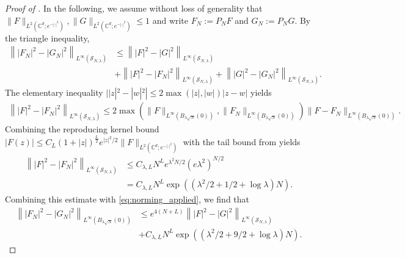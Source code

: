 \documentclass[11pt]{amsart}
\begin{document}
\begin{proof}[Proof of ]
    In the following, we assume without loss of generality that $\|F\|_{L^2(\mathbb C^d;e^{-|\cdot|^2})}, \|G\|_{L^2(\mathbb C^d;e^{-|\cdot|^2})} \leq 1$ and write $F_N := P_N F$ and $G_N := P_N G$. By the triangle inequality,
    \begin{align*}
        \left\lVert |F_N|^2-|G_N|^2 \right\rVert_{L^\infty(\mathcal S_{N,\lambda})} &\leq \left\lVert |F|^2-|G|^2 \right\rVert_{L^\infty(\mathcal S_{N,\lambda})} \\ &+ \left\lVert |F|^2-|F_N|^2 \right\rVert_{L^\infty(\mathcal S_{N,\lambda})} + \left\lVert |G|^2-|G_N|^2 \right\rVert_{L^\infty(\mathcal S_{N,\lambda})}.
    \end{align*}
    The elementary inequality $||z|^2-|w|^2| \leq 2 \max(|z|,|w|) |z-w|$ yields
    \begin{align*}
        \left\lVert |F|^2-|F_N|^2 \right\rVert_{L^\infty(\mathcal S_{N,\lambda})} \leq 2 \max(\|F\|_{L^\infty(B_{\lambda \sqrt{N}}(0))},\|F_N\|_{L^\infty(B_{\lambda \sqrt{N}}(0))}) \| F - F_N \|_{L^\infty(B_{\lambda \sqrt{N}}(0))}.
    \end{align*}
    Combining the reproducing kernel bound $|F(z)| \leq C_{L}(1+|z|)^{\frac L2} e^{|z|^2/2} \|F\|_{L^2(\mathbb C^d;e^{-|\cdot|^2})}$ with the tail bound from  yields
    \begin{align*}
        \left\lVert |F|^2-|F_N|^2 \right\rVert_{L^\infty(\mathcal S_{N,\lambda})} &\leq C_{\lambda,L} N^{L} e^{\lambda^2N/2} (e \lambda^2)^{N/2} \\
        &= C_{\lambda,L} N^{L} \exp((\lambda^2/2 + 1/2 + \log \lambda) N).
    \end{align*}
    Combining this estimate with \eqref{eq:norming_applied}, we find that 
    \begin{align*}
        \left\lVert |F_N|^2-|G_N|^2 \right 
        \rVert_{L^\infty(B_{\lambda \sqrt{N}}(0))}
        &\leq e^{4(N+L)} \left\lVert |F|^2-|G|^2 \right
        \rVert_{L^\infty(\mathcal S_{N,\lambda})} \\
        &+ C_{\lambda,L} N^{L} \exp\left(\left(\lambda^2/2 + 9/2 + \log \lambda\right) N\right).
    \end{align*}


\end{proof}
\end{document}
